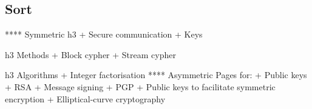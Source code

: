 
\subsection{Sort}


**** Symmetric
h3 
+ Secure communication
+ Keys

h3 Methods
+ Block cypher
+ Stream cypher

h3 Algorithms
+ Integer factorisation
**** Asymmetric
Pages for:
+ Public keys
+ RSA
+ Message signing
+ PGP
+ Public keys to facilitate symmetric encryption
+ Elliptical-curve cryptography

